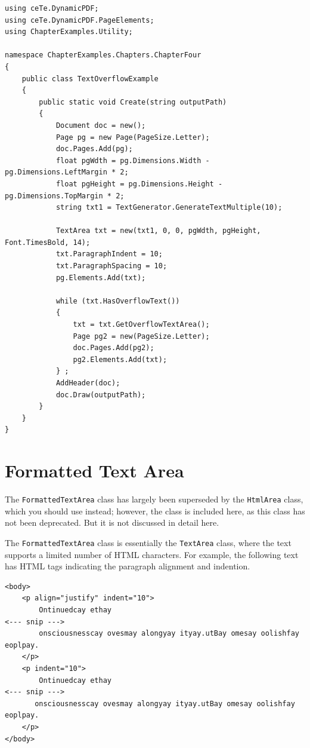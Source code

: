 \documentclass[american,letterpaper]{tufte-book}
\numberwithin{equation}{section}
\numberwithin{figure}{section}
\begin{document}
\bgroup{}
\begin{lstlisting}[caption={Handling text overflow.},label={lis:Handling-text-overflow},basicstyle={\small\ttfamily},breaklines=true]
using ceTe.DynamicPDF;
using ceTe.DynamicPDF.PageElements;
using ChapterExamples.Utility;

namespace ChapterExamples.Chapters.ChapterFour
{
    public class TextOverflowExample
    {
        public static void Create(string outputPath)
        {
            Document doc = new();
            Page pg = new Page(PageSize.Letter);
            doc.Pages.Add(pg);
            float pgWdth = pg.Dimensions.Width - pg.Dimensions.LeftMargin * 2;
            float pgHeight = pg.Dimensions.Height - pg.Dimensions.TopMargin * 2;
            string txt1 = TextGenerator.GenerateTextMultiple(10);

            TextArea txt = new(txt1, 0, 0, pgWdth, pgHeight, Font.TimesBold, 14);
            txt.ParagraphIndent = 10;
            txt.ParagraphSpacing = 10;
            pg.Elements.Add(txt);

            while (txt.HasOverflowText())
            {
                txt = txt.GetOverflowTextArea();
                Page pg2 = new(PageSize.Letter);
                doc.Pages.Add(pg2);
                pg2.Elements.Add(txt);
            } ;
            AddHeader(doc);
            doc.Draw(outputPath);
        }
    } 
}
\end{lstlisting}
\leavevmode\egroup


\section{Formatted Text Area}

The \texttt{FormattedTextArea} class has largely been superseded by
the \texttt{HtmlArea} class, which you should use instead; however,
the class is included here, as this class has not been deprecated.
But it is not discussed in detail here.

The \texttt{FormattedTextArea} class is essentially the \texttt{TextArea}
class, where the text supports a limited number of HTML characters.
For example, the following text has HTML tags indicating the paragraph
alignment and indention.

\bgroup{}
\begin{lstlisting}[basicstyle={\small\ttfamily},breaklines=true]
<body>
    <p align="justify" indent="10">
        Ontinuedcay ethay
<--- snip --->
        onsciousnesscay ovesmay alongyay ityay.utBay omesay oolishfay eoplpay.
    </p>
    <p indent="10">
        Ontinuedcay ethay
<--- snip --->
       onsciousnesscay ovesmay alongyay ityay.utBay omesay oolishfay eoplpay.
    </p>
</body>
\end{lstlisting}
\leavevmode\egroup
\end{document}
